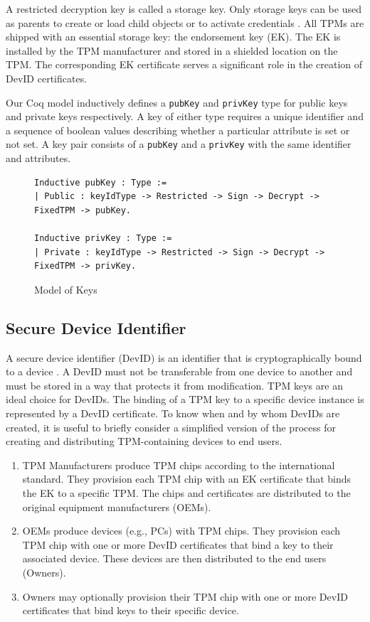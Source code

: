\documentclass[runningheads]{llncs}
\begin{document}
A restricted decryption key is called a storage key. Only storage keys
can be used as parents to create or load child objects or to activate
credentials \citep{PracticalGuide}. All TPMs are shipped with an
essential storage key: the endorsement key (EK). The EK is installed
by the TPM manufacturer and stored in a shielded location on the
TPM. The corresponding EK certificate serves a significant role in the
creation of DevID certificates.

Our Coq model inductively defines a \verb|pubKey| and \verb|privKey|
type for public keys and private keys respectively. A key of either
type requires a unique identifier and a sequence of boolean values
describing whether a particular attribute is set or not set. A key
pair consists of a \verb|pubKey| and a \verb|privKey| with the same
identifier and attributes.

\begin{figure}[h]
\begin{lstlisting}[language=Coq]
Inductive pubKey : Type :=
| Public : keyIdType -> Restricted -> Sign -> Decrypt -> FixedTPM -> pubKey.

Inductive privKey : Type :=
| Private : keyIdType -> Restricted -> Sign -> Decrypt -> FixedTPM -> privKey.
\end{lstlisting}

\caption{Model of Keys}
\end{figure}

\subsection{Secure Device Identifier}
A secure device identifier (DevID) is an identifier that is
cryptographically bound to a device \citep{DevIDSpec-IEEE}. A DevID
must not be transferable from one device to another and must be stored
in a way that protects it from modification. TPM keys are an ideal
choice for DevIDs.  The binding of a TPM key to a specific device
instance is represented by a DevID certificate.  To know when and by
whom DevIDs are created, it is useful to briefly consider a simplified
version of the process for creating and distributing TPM-containing
devices to end users.

\begin{enumerate}
\item\label{ite:idTPM} TPM Manufacturers produce TPM chips according
  to the international standard. They provision each TPM chip with an
  EK certificate that binds the EK to a specific TPM. The chips and
  certificates are distributed to the original equipment
  manufacturers (OEMs).
\item\label{ite:idDevIni} OEMs produce devices (e.g., PCs) with TPM
  chips. They provision each TPM chip with one or more DevID
  certificates that bind a key to their associated device. These
  devices are then distributed to the end users (Owners).
\item\label{ite:idDevLoc} Owners may optionally provision their TPM
  chip with one or more DevID certificates that bind keys to their
  specific device. 
\end{enumerate} 
\end{document}
